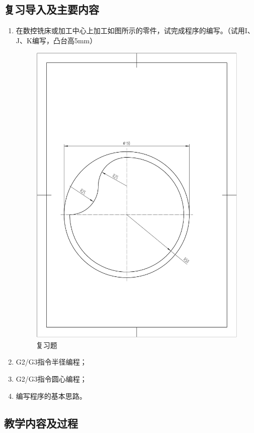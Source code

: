 \subsection{复习导入及主要内容}
\begin{enumerate}[1、]
\item 在数控铣床或加工中心上加工如图所示的零件，试完成程序的编写。（试用I、J、K编写，凸台高5mm）

\begin{figure}[h]
	\centering
	\includegraphics[width=0.8\linewidth,trim=40 150 70 220,clip]{data/image/7-1.jpg}
	\caption{复习题}
	\label{fig:7-1}
\end{figure}

\item G2/G3指令半径编程；
\item G2/G3指令圆心编程；
\item 编写程序的基本思路。
\end{enumerate}

\subsection{教学内容及过程}

